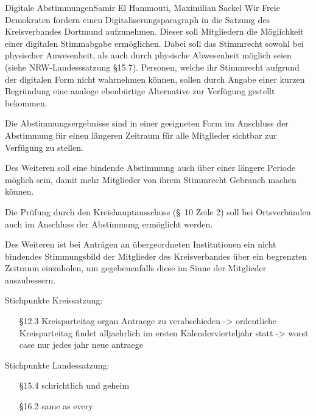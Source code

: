 \documentclass{../../templates/amendment}
\date{18. August 2020}
\begin{document}
\begin{boxed}{Digitale Abstimmungen}{Samir El Hammouti, Maximilian Sackel}
Wir Freie Demokraten fordern einen Digitaliserungsparagraph in die Satzung des
Kreisverbandes Dortmund aufzunehmen.
Dieser soll Mitgliedern die Möglichkeit einer digitalen Stimmabgabe ermöglichen.
Dabei soll das Stimmrecht sowohl bei physischer Anwesenheit, als auch durch
physische Abwesenheit möglich seien (siehe NRW-Landesssatzung \S 15.7).
Personen, welche ihr Stimmrecht aufgrund der digitalen Form nicht wahrnehmen können,
sollen durch Angabe einer kurzen Begründung eine analoge ebenbürtige Alternative
zur Verfügung gestellt bekommen.

Die Abstimmungsergebnisse sind in einer geeigneten Form im Anschluss der Abstimmung
für einen längeren Zeitraum für alle Mitglieder sichtbar zur Verfügung zu stellen.

Des Weiteren soll eine bindende Abstimmung auch über einer längere Periode möglich
sein, damit mehr Mitglieder von ihrem Stimmrecht Gebrauch machen können.

Die Prüfung durch den Kreishauptausschuss (\S~10 Zeile 2) soll bei Ortsverbänden
auch im Anschluss der Abstimmung ermöglicht werden.

Des Weiteren ist bei Anträgen an übergeordneten Institutionen ein nicht bindendes
Stimmungsbild der Mitglieder des Kreisverbandes über ein begrenzten Zeitraum
einzuholen, um gegebenenfalls diese im Sinne der Mitglieder auszubessern.


Stichpunkte Kreissatzung:
\begin{itemize}
    \item[\S 12.3] Kreisparteitag organ Antraege zu verabschieden -> ordentliche
        Kreisparteitag findet alljaehrlich im ersten Kalendervierteljahr statt
        -> worst case nur jedes jahr neue antraege
\end{itemize}

Stichpunkte Landessatzung:
\begin{itemize}
    \item[\S 15.4] schrichtlich und geheim
    \item[\S 16.2] same as every
\end{itemize}
\end{boxed}
\end{document}
